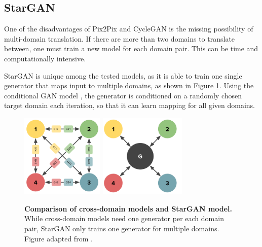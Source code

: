 \documentclass[12pt]{report}
\begin{document}
\pagebreak
\subsection{StarGAN}

One of the disadvantages of Pix2Pix and CycleGAN is the missing possibility of multi-domain translation. If there are more than two domains to translate between, one must train a new model for each domain pair. This can be time and computationally intensive.

StarGAN \cite{choi_stargan_2017} is unique among the tested models, as it is able to train one single generator that maps input to multiple domains, as shown in Figure \ref{fig:stargan_topo}. Using the conditional GAN model \cite{mirza_conditional_2014}, the generator is conditioned on a randomly chosen target domain each iteration, so that it can learn mapping for all given domains. %

\begin{figure}[h]
\centering
{}
{\includegraphics[height=4cm]{03_analysis/gans/StarGAN_graph}}\hspace{1cm}
{\includegraphics[height=4cm]{03_analysis/gans/StarGAN_graph2}}
\caption{\label{fig:stargan_topo} \textbf{Comparison of cross-domain models and StarGAN model.} While cross-domain models need one generator per each domain pair, StarGAN only trains one generator for multiple domains. Figure adapted from \cite{choi_stargan_2017}.}
\end{figure}
\end{document}
